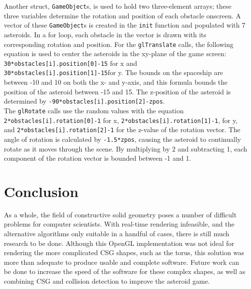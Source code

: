 \documentclass[12pt]{article}
\begin{document}
\begin{doublespace}
Another struct, \texttt{GameObject}s, is used to hold two three-element arrays; these three variables determine the rotation and position of each obstacle onscreen. A vector of these \texttt{GameObject}s is created in the \texttt{init} function and populated with 7 asteroids. In a for loop, each obstacle in the vector is drawn with its corresponding rotation and position. For the \texttt{glTranslate} calls, the following equation is used to center the asteroids in the xy-plane of the game screen: \texttt{30*obstacles[i].position[0]-15} for x and \texttt{30*obstacles[i].position[1]-15}for y. The bounds on the spaceship are between -10 and 10 on both the x- and y-axis, and this formula bounds the position of the asteroid between -15 and 15. The z-position of the asteroid is determined by \texttt{-90*obstacles[i].position[2]-zpos}.\\

The \texttt{glRotate} calls use the random values with the equation \texttt{2*obstacles[i].rotation[0]-1} for x, \texttt{2*obstacles[i].rotation[1]-1}, for y, and \texttt{2*obstacles[i].rotation[2]-1} for the z-value of the rotation vector. The angle of rotation is calculated by \texttt{-1.5*zpos}, causing the asteroid to continually rotate as it moves through the scene. By multiplying by 2 and subtracting 1, each component of the rotation vector is bounded between -1 and 1.
\section{Conclusion}
As a whole, the field of constructive solid geometry poses a number of difficult problems for computer scientists. With real-time rendering infeasible, and the alternative algorithms only suitable in a handful of cases, there is still much research to be done. Although this OpenGL implementation was not ideal for rendering the more complicated CSG shapes, such as the torus, this solution was more than adequate to produce usable and complete software. Future work can be done to increase the speed of the software for these complex shapes, as well as combining CSG and collision detection to improve the asteroid game.
\newpage
\end{doublespace}
\end{document}
